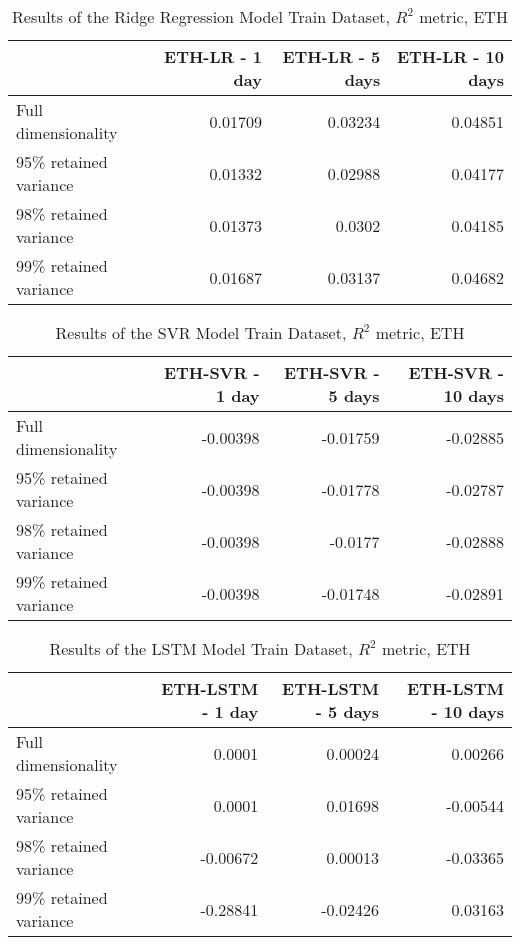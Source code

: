 

\begin{table}[htbp]
    \centering
    \caption{Results of the Ridge Regression Model Train Dataset, $R^2$ metric, ETH}
    \begin{tabular}{lrrr}
        \toprule
        {} &  ETH-LR - 1 day &  ETH-LR - 5 days &  ETH-LR - 10 days \\
        \midrule
        Full dimensionality   &      0.01709    &     0.03234     &        0.04851    \\
        95\% retained variance &     0.01332    &   0.02988 &     0.04177     \\
        98\% retained variance &    0.01373   &     0.0302   &    0.04185  \\
        99\% retained variance &   0.01687    &     0.03137    &  0.04682   \\
        \bottomrule
    \end{tabular}
    \end{table}
    
    
    \begin{table}[htbp]
        \centering
        \caption{Results of the SVR Model Train Dataset, $R^2$ metric, ETH}
    \begin{tabular}{lrrr}
        \toprule
        {} &  ETH-SVR - 1 day &  ETH-SVR - 5 days &  ETH-SVR - 10 days \\
        \midrule
        Full dimensionality   &  -0.00398   &    -0.01759     &   -0.02885       \\
        95\% retained variance &  -0.00398  &    -0.01778     &   -0.02787        \\
        98\% retained variance &  -0.00398   &   -0.0177      &   -0.02888      \\
        99\% retained variance &  -0.00398  &    -0.01748     &  -0.02891   \\
        \bottomrule
    \end{tabular}
    \end{table}
    
    \begin{table}[htbp]
        \centering
        \caption{Results of the LSTM Model Train Dataset, $R^2$ metric, ETH}
    \begin{tabular}{lrrr}
        \toprule
        {} &  ETH-LSTM - 1 day &  ETH-LSTM - 5 days &  ETH-LSTM - 10 days \\
        \midrule
        Full dimensionality   &    0.0001   &      0.00024     &      0.00266     \\
        95\% retained variance &   0.0001    &    0.01698       &     -0.00544       \\
        98\% retained variance &    -0.00672   &    0.00013      &    -0.03365        \\
        99\% retained variance &  -0.28841    &   -0.02426    &        0.03163   \\
        \bottomrule
    \end{tabular}
    \end{table}
    
